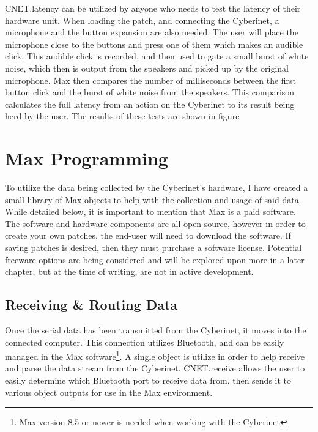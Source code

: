 CNET.latency can be utilized by anyone who needs to test the latency of their hardware unit. When loading the patch, and connecting the Cyberinet, a microphone and the button expansion are also needed. The user will place the microphone close to the buttons and press one of them which makes an audible click. This audible click is recorded, and then used to gate a small burst of white noise, which then is output from the speakers and picked up by the original microphone. Max then compares the number of milliseconds between the first button click and the burst of white noise from the speakers. This comparison calculates the full latency from an action on the Cyberinet to its result being herd by the user. The results of these tests are shown in figure  

\section{Max Programming}

To utilize the data being collected by the Cyberinet’s hardware, I have created a small library of Max objects to help with the collection and usage of said data. While detailed below, it is important to mention that Max is a paid software. The software and hardware components are all open source, however in order to create your own patches, the end-user will need to download the software. If saving patches is desired, then they must purchase a software license. Potential freeware options are being considered and will be explored upon more in a later chapter, but at the time of writing, are not in active development.

\subsection{Receiving \& Routing Data}

Once the serial data has been transmitted from the Cyberinet, it moves into the connected computer. This connection utilizes Bluetooth, and can be easily managed in the Max software\footnote{Max version 8.5 or newer is needed when working with the Cyberinet}. A single object is utilize in order to help receive and parse the data stream from the Cyberinet. CNET.receive allows the user to easily determine which Bluetooth port to receive data from, then sends it to various object outputs for use in the Max environment.


